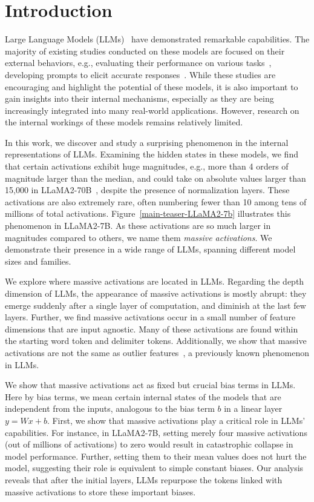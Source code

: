 \documentclass[10pt]{article}
\theoremstyle{definition}
\theoremstyle{plain}
\begin{document}
\section{Introduction}

Large Language Models (LLMs)~\citep{brown2020gpt3, openai2023gpt4} have demonstrated remarkable capabilities. The majority of existing studies conducted on these models are focused on their external behaviors, e.g., evaluating their performance on various tasks~\citep{gpt_bar,bubeck2023sparks}, developing prompts to elicit accurate responses~\citep{wei2022cot,yang2023optimizer}.  While these studies are encouraging and highlight the potential of these models, it is also important to gain insights into their internal mechanisms, especially as they are being increasingly integrated into many real-world applications. However, research on the internal workings of these models remains relatively limited. 


In this work, we discover and study a surprising phenomenon in the internal representations of LLMs. Examining the hidden states in these models, we find that certain activations exhibit huge magnitudes, e.g., more than 4 orders of magnitude larger than the median, and could take on absolute values larger than 15,000 in LLaMA2-70B~\citep{touvron2023LLaMA2}, despite the presence of normalization layers. These activations are also extremely rare, often numbering fewer than 10 among tens of millions of total activations. Figure~\ref{main-teaser-LLaMA2-7b} illustrates this phenomenon in LLaMA2-7B. As these activations are so much larger in magnitudes compared to others, we name them \textit{massive activations}. We demonstrate their presence in a wide range of LLMs, spanning different model sizes and families. 

We explore where massive activations are located in LLMs. Regarding the depth dimension of LLMs, the appearance of massive activations is mostly abrupt: they emerge suddenly after a single layer of computation, and  diminish at the last few layers. Further, we find massive activations occur in a small number of feature dimensions that are input agnostic. Many of these activations are found within the starting word token and delimiter tokens. Additionally, we show that massive activations are not the same as outlier features~\citep{dettmers2022llmint8}, a previously known phenomenon in LLMs.

We show that massive activations act as fixed but crucial bias terms in LLMs. Here by bias terms, we mean certain internal states of the models that are independent from the inputs, analogous to the bias term $b$ in a linear layer $y=Wx+b$. First, we show that massive activations play a critical role in LLMs' capabilities. For instance, in LLaMA2-7B, setting merely four massive activations (out of millions of activations) to zero would result in catastrophic collapse in model performance. Further, setting them to their mean values does not hurt the model, suggesting their role is equivalent to simple constant biases. Our analysis reveals that after the initial layers, LLMs repurpose the tokens linked with massive activations to store these important biases.
\end{document}
